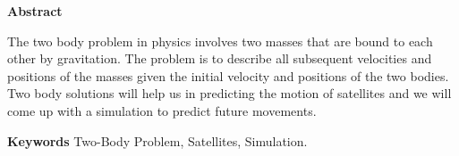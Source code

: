 \thispagestyle{plain}
\begin{center}
    
    \vspace{0.9cm}
    \textbf{Abstract}
\end{center}
The two body problem in physics involves two masses that are bound to each other by gravitation. The problem is to describe all subsequent velocities and positions of the masses given the initial velocity and positions of the two bodies. Two body solutions will help us in predicting the motion of satellites and we will come up with a simulation to predict future movements.

\vspace{0.9cm}
\textbf{Keywords} Two-Body Problem, Satellites, Simulation. 
